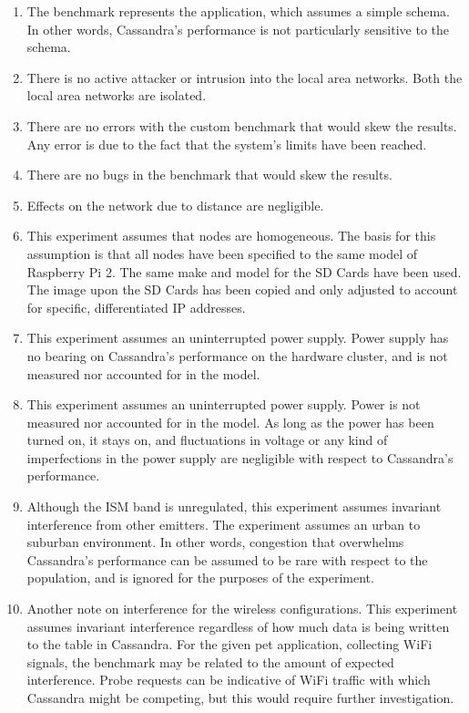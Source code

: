 \begin{enumerate}

\item The benchmark represents the application, which assumes a simple schema.  In other words, Cassandra's performance is not particularly sensitive to the schema.

\item There is no active attacker or intrusion into the local area networks.  Both the local area networks are isolated.

\item There are no errors with the custom benchmark that would skew the results.  Any error is due to the fact that the system's limits have been reached.

\item There are no bugs in the benchmark that would skew the results.

\item Effects on the network due to distance are negligible.

\item This experiment assumes that nodes are homogeneous.  The basis for this assumption is that all nodes have been specified to the same model of Raspberry Pi 2.  The same make and model for the SD Cards have been used.  The image upon the SD Cards has been copied and only adjusted to account for specific, differentiated IP addresses.

\item This experiment assumes an uninterrupted power supply.  Power supply has no bearing on Cassandra’s performance on the hardware cluster, and is not measured nor accounted for in the model.

\item This experiment assumes an uninterrupted power supply.  Power is not measured nor accounted for in the model.  As long as the power has been turned on, it stays on, and fluctuations in voltage or any kind of imperfections in the power supply are negligible with respect to Cassandra's performance.

\item Although the ISM band is unregulated, this experiment assumes invariant interference from other emitters.  The experiment assumes an urban to suburban environment.  In other words, congestion that overwhelms Cassandra's performance can be assumed to be rare with respect to the population, and is ignored for the purposes of the experiment.

\item Another note on interference for the wireless configurations.  This experiment assumes invariant interference regardless of how much data is being written to the table in Cassandra. For the given pet application, collecting WiFi signals, the benchmark may be related to the amount of expected interference.  Probe requests can be indicative of WiFi traffic with which Cassandra might be competing, but this would require further investigation.  

\end{enumerate}

